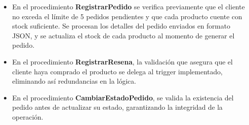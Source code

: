 \begin{itemize}
  \item En el procedimiento \textbf{RegistrarPedido} se verifica previamente que el cliente no exceda el límite de 5 pedidos pendientes y que cada producto cuente con stock suficiente. Se procesan los detalles del pedido enviados en formato JSON, y se actualiza el stock de cada producto al momento de generar el pedido.
  \item En el procedimiento \textbf{RegistrarResena}, la validación que asegura que el cliente haya comprado el producto se delega al trigger implementado, eliminando así redundancias en la lógica.
  \item En el procedimiento \textbf{CambiarEstadoPedido}, se valida la existencia del pedido antes de actualizar su estado, garantizando la integridad de la operación.
\end{itemize}


